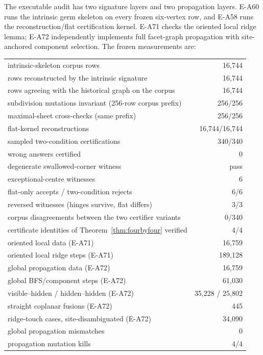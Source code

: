 \documentclass[11pt]{amsart}
\theoremstyle{definition}
\begin{document}
The executable audit has two signature layers and two propagation layers.
E-A60 runs the intrinsic germ skeleton on every frozen six-vertex row, and
E-A58 runs the reconstruction/flat certification kernel.  E-A71 checks the
oriented local ridge lemma; E-A72 independently implements full facet-graph
propagation with site-anchored component selection.  The frozen measurements
are:

\begin{center}
\begin{tabular}{lr}
\hline
intrinsic-skeleton corpus rows & 16,744\\
rows reconstructed by the intrinsic signature & 16,744\\
rows agreeing with the historical graph on the corpus & 16,744\\
subdivision mutations invariant (256-row corpus prefix) & 256/256\\
maximal-sheet cross-checks (same prefix) & 256/256\\
flat-kernel reconstructions & 16,744/16,744\\
sampled two-condition certifications & 340/340\\
wrong answers certified & 0\\
degenerate swallowed-corner witness & pass\\
exceptional-centre witnesses & 6\\
flat-only accepts / two-condition rejects & 6/6\\
reversed witnesses (hinges survive, flat differs) & 3/3\\
corpus disagreements between the two certifier variants & 0/340\\
certificate identities of Theorem~\ref{thm:fourbyfour} verified & 4/4\\
oriented local data (E-A71) & 16,759\\
oriented local ridge steps (E-A71) & 189,128\\
global propagation data (E-A72) & 16,759\\
global BFS/component steps (E-A72) & 61,030\\
visible--hidden / hidden--hidden (E-A72) & 35,228 / 25,802\\
straight coplanar fusions (E-A72) & 445\\
ridge-touch cases, site-disambiguated (E-A72) & 34,090\\
global propagation mismatches & 0\\
propagation mutation kills & 4/4\\
\hline
\end{tabular}
\end{center}
\end{document}
